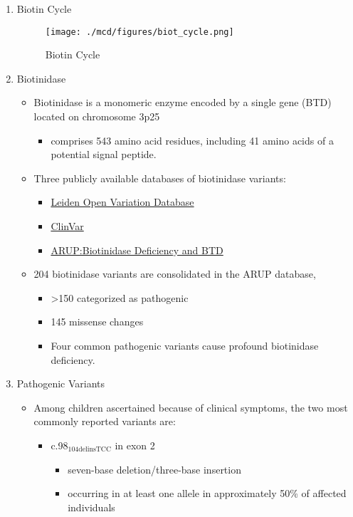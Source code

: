 \documentclass{scrartcl}
\begin{document}
\begin{enumerate}
\item Biotin Cycle
\label{sec:orgeed2308}
\begin{figure}[htbp]
\centering
\texttt{[image: ./mcd/figures/biot\_cycle.png]}
\caption[Biotin Cycle]{\label{fig:org4da6d1e}
Biotin Cycle}
\end{figure}


\item Biotinidase
\label{sec:org91cbf09}

\begin{itemize}
\item Biotinidase is a monomeric enzyme encoded by a single gene (BTD) located on chromosome 3p25
\begin{itemize}
\item comprises 543 amino acid residues, including 41 amino acids of a potential signal peptide.
\end{itemize}

\item Three publicly available databases of biotinidase variants:
\begin{itemize}
\item \href{https://grenada.lumc.nl/LOVD2/shared1/home.php?select\_db=BTD}{Leiden Open Variation Database}
\item \href{https://www.ncbi.nlm.nih.gov/clinvar/}{ClinVar}
\item \href{http://www.arup.utah.edu/database/BTD/BTD\_welcome.php}{ARUP:Biotinidase Deficiency and BTD}
\end{itemize}

\item 204 biotinidase variants are consolidated in the ARUP database,
\begin{itemize}
\item >150 categorized as pathogenic
\item 145 missense changes
\item Four common pathogenic variants cause profound biotinidase deficiency.
\end{itemize}
\end{itemize}

\item Pathogenic Variants
\label{sec:org9f5bebb}
\begin{itemize}
\item Among children ascertained because of clinical symptoms, the two
most commonly reported variants are:

\begin{itemize}
\item c.98\(_{\text{104delinsTCC}}\) in exon 2
\begin{itemize}
\item seven-base deletion/three-base insertion
\item occurring in at least one allele in approximately 50\% of affected individuals
\end{itemize}


\end{itemize}
\end{itemize}
\end{enumerate}
\end{document}

